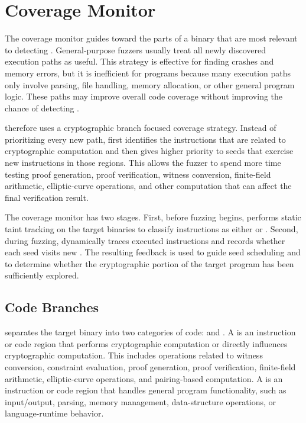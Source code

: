 \section{Coverage Monitor}
\label{sec:greybox-coverage_monitor}


The coverage monitor guides \greyboxfuzz toward the parts of a \zksnark binary that are most relevant to detecting \logicerror. General-purpose fuzzers usually treat all newly discovered execution paths as useful. This strategy is effective for finding crashes and memory errors, but it is inefficient for \zksnark programs because many execution paths only involve parsing, file handling, memory allocation, or other general program logic. These paths may improve overall code coverage without improving the chance of detecting \logicerror.

\greyboxfuzz therefore uses a cryptographic branch focused coverage strategy. Instead of prioritizing every new path, \greyboxfuzz first identifies the instructions that are related to cryptographic computation and then gives higher priority to seeds that exercise new instructions in those regions. This allows the fuzzer to spend more time testing proof generation, proof verification, witness conversion, finite-field arithmetic, elliptic-curve operations, and other computation that can affect the final verification result.

The coverage monitor has two stages. First, before fuzzing begins, \greyboxfuzz performs static taint tracking on the target binaries to classify instructions as either \cryptobranch or \programbranch. Second, during fuzzing, \greyboxfuzz dynamically traces executed instructions and records whether each seed visits new \cryptobranch. The resulting feedback is used to guide seed scheduling and to determine whether the cryptographic portion of the target program has been sufficiently explored.

\subsection{\zksnark Code Branches}
\label{subsec:greybox-zkp_code_branch}
\greyboxfuzz separates the target binary into two categories of code: \cryptobranch and \programbranch. A \cryptobranch is an instruction or code region that performs cryptographic computation or directly influences cryptographic computation. This includes operations related to witness conversion, constraint evaluation, proof generation, proof verification, finite-field arithmetic, elliptic-curve operations, and pairing-based computation. A \programbranch is an instruction or code region that handles general program functionality, such as input/output, parsing, memory management, data-structure operations, or language-runtime behavior.

